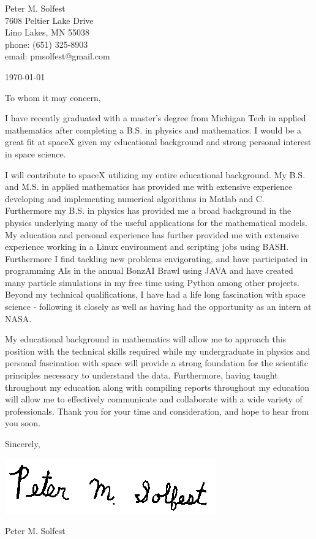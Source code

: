 \documentclass[letterpaper,12pt]{article}
\begin{document}
Peter M. Solfest\\
7608 Peltier Lake Drive\\
Lino Lakes, MN 55038\\
phone: (651) 325-8903\\
email: pmsolfest@gmail.com

\today


To whom it may concern, %

I have recently graduated with a master's degree from Michigan Tech in applied mathematics after
completing a B.S. in physics and mathematics.
I would be a great fit at spaceX given my educational background
and strong personal interest in space science.

I will contribute to spaceX utilizing my entire educational background.
My B.S. and M.S. in applied mathematics has provided me with extensive experience developing
and implementing numerical algorithms in Matlab and C.
Furthermore my B.S. in physics has provided me a broad background in the physics
underlying many of the useful applications for the mathematical models.
My education and personal experience has further provided me with
extensive experience working in a Linux environment and scripting
jobs using BASH.
Furthermore I find tackling new problems envigorating, and have
participated in programming AIs in the annual BonzAI Brawl using JAVA and
have created many particle simulations in my free time using Python among
other projects.
Beyond my technical qualifications, I have had a life long fascination with
space science - following it closely as well as having had the opportunity
as an intern at NASA.

My educational background in mathematics will allow 
me to approach this position with the technical skills required
while my undergraduate in physics and personal fascination with space
will provide a strong foundation for the scientific principles necessary
to understand the data.
Furthermore, having taught throughout my education along with compiling reports
throughout my education will allow me to effectively communicate and
collaborate with a wide variety of professionals.
Thank you for your time and consideration, and hope to hear from you soon.

Sincerely,

\includegraphics[height=.5in]{signature.png}

Peter M. Solfest
\end{document}
